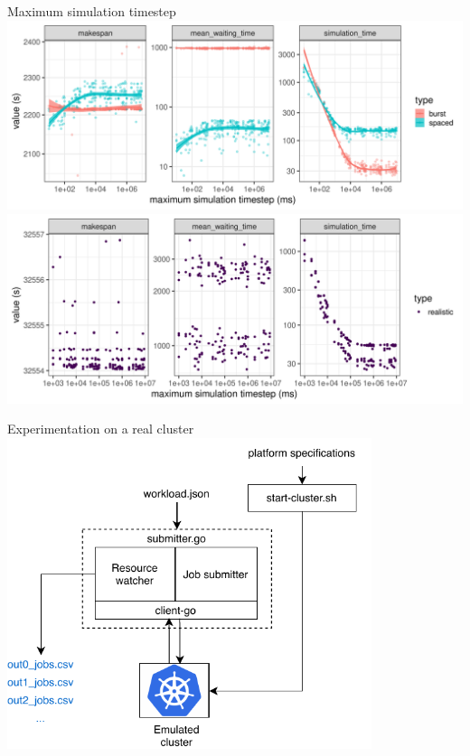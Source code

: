 \documentclass[12pt, aspectratio=43]{beamer}
\begin{document}
\begin{frame}[allowframebreaks]{Maximum simulation timestep}
	\centering
	\includegraphics[width=\textwidth]{../imgs/max-timestep_burst_sp.png}
	\includegraphics[width=\textwidth]{../imgs/max-timestep_realistic.png}
\end{frame}

\begin{frame}{Experimentation on a real cluster}
	\centering
	\includegraphics[width=0.8\textwidth]{../imgs/expe-protocole-v2.pdf}
\end{frame}
\end{document}
